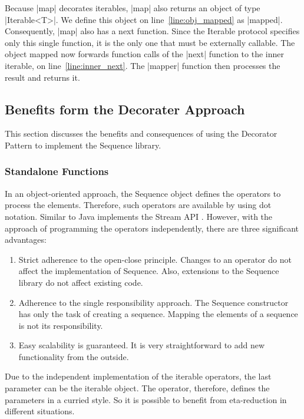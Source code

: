 Because |map| decorates iterables, |map| also returns an object of type |Iterable<T>|. 
We define this object on line~\ref{line:obj_mapped} as |mapped|. 
Consequently, |map| also has a next function. Since the Iterable protocol 
specifies only this single function, it is the only one that must be externally 
callable. The object mapped now forwards function calls of the |next| function to 
the inner iterable, on line~\ref{line:inner_next}. The |mapper| function then 
processes the result and returns it.

\subsection{Benefits form the Decorater Approach}
\label{sub:Benefits form the Decorater Approach}
This section discusses the benefits and consequences of using the Decorator 
Pattern to implement the Sequence library.

\subsubsection{Standalone Functions}
\label{subsub:Standalone Functions}
In an object-oriented approach, the Sequence object defines the operators to 
process the elements. Therefore, such operators are available by using dot notation. 
Similar to Java implements the Stream API \cite{java_stream}. 
However, with the approach of programming the operators independently, there 
are three significant advantages:

\begin{enumerate}
  \item {Strict adherence to the open-close principle. Changes to an operator do
      not affect the implementation of Sequence. Also, extensions to the 
      Sequence library do not affect existing code.
    }
  \item{Adherence to the single responsibility approach. The Sequence 
      constructor has only the task of creating a sequence. Mapping the
    elements of a sequence is not its responsibility.
  }
  \item{Easy scalability is guaranteed. It is very straightforward to add new 
    functionality from the outside.
  }
\end{enumerate}

Due to the independent implementation of the iterable operators, the last 
parameter can be the iterable object. The operator, therefore, defines the 
parameters in a curried style. So it is possible to benefit from eta-reduction 
in different situations.

